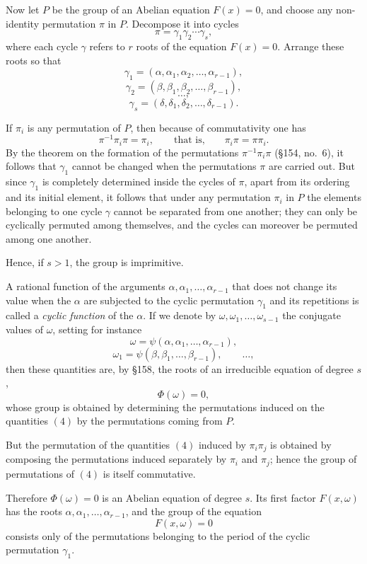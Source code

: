 \documentclass[11pt,a4paper]{book}
\begin{document}
Now let $P$ be the group of an Abelian equation $F(x)=0$, and choose any non-identity permutation $\pi$ in $P$. Decompose it into cycles
\[
\pi = \gamma_1\gamma_2\cdots\gamma_s,
\tag{1}
\]
where each cycle $\gamma$ refers to $r$ roots of the equation $F(x)=0$. Arrange these roots so that
\[
\gamma_1=(\alpha,\alpha_1,\alpha_2,\dots,\alpha_{r-1}),
\]
\[
\gamma_2=(\beta,\beta_1,\beta_2,\dots,\beta_{r-1}),
\]
\[
\dots,
\]
\[
\gamma_s=(\delta,\delta_1,\delta_2,\dots,\delta_{r-1}).
\tag{2}
\]

If $\pi_i$ is any permutation of $P$, then because of commutativity one has
\[
\pi^{-1}\pi_i\pi=\pi_i,
\qquad\text{that is,}\qquad
\pi_i\pi=\pi\pi_i.
\tag{3}
\]
By the theorem on the formation of the permutations $\pi^{-1}\pi_i\pi$ (\S 154, no.\ 6), it follows that $\gamma_1$ cannot be changed when the permutations $\pi$ are carried out. But since $\gamma_1$ is completely determined inside the cycles of $\pi$, apart from its ordering and its initial element, it follows that under any permutation $\pi_i$ in $P$ the elements belonging to one cycle $\gamma$ cannot be separated from one another; they can only be cyclically permuted among themselves, and the cycles can moreover be permuted among one another.

Hence, if $s>1$, the group is imprimitive.

A rational function of the arguments $\alpha,\alpha_1,\dots,\alpha_{r-1}$ that does not change its value when the $\alpha$ are subjected to the cyclic permutation $\gamma_1$ and its repetitions is called a \emph{cyclic function} of the $\alpha$. If we denote by $\omega,\omega_1,\dots,\omega_{s-1}$ the conjugate values of $\omega$, setting for instance
\[
\omega=\psi(\alpha,\alpha_1,\dots,\alpha_{r-1}),
\]
\[
\omega_1=\psi(\beta,\beta_1,\dots,\beta_{r-1}),
\qquad\dots,
\tag{4}
\]
then these quantities are, by \S 158, the roots of an irreducible equation of degree $s$,
\[
\Phi(\omega)=0,
\tag{5}
\]
whose group is obtained by determining the permutations induced on the quantities \((4)\) by the permutations coming from $P$.

But the permutation of the quantities \((4)\) induced by $\pi_i\pi_j$ is obtained by composing the permutations induced separately by $\pi_i$ and $\pi_j$; hence the group of permutations of \((4)\) is itself commutative.

Therefore $\Phi(\omega)=0$ is an Abelian equation of degree $s$. Its first factor $F(x,\omega)$ has the roots $\alpha,\alpha_1,\dots,\alpha_{r-1}$, and the group of the equation
\[
F(x,\omega)=0
\]
consists only of the permutations belonging to the period of the cyclic permutation $\gamma_1$.
\end{document}
